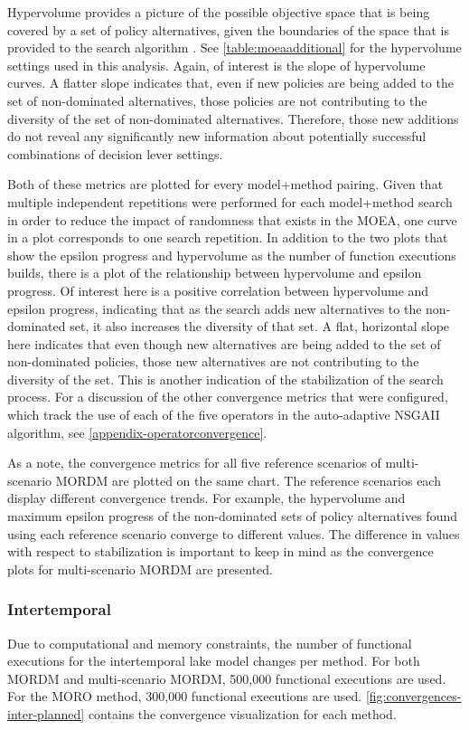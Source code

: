     Hypervolume provides a picture of the possible objective space that is being covered by a set of policy alternatives, given the boundaries of the space that is provided to the search algorithm \citep{Reed2013}.  See \cref{table:moeaadditional} for the hypervolume settings used in this analysis. Again, of interest is the slope of hypervolume curves. A flatter slope indicates that, even if new policies are being added to the set of non-dominated alternatives, those policies are not contributing to the diversity of the set of non-dominated alternatives. Therefore, those new additions do not reveal any significantly new information about potentially successful combinations of decision lever settings.
    
    Both of these metrics are plotted for every model+method pairing. Given that multiple independent repetitions were performed for each model+method search in order to reduce the impact of randomness that exists in the MOEA, one curve in a plot corresponds to one search repetition. In addition to the two plots that show the epsilon progress and hypervolume as the number of function executions builds, there is a plot of the relationship between hypervolume and epsilon progress. Of interest here is a positive correlation between hypervolume and epsilon progress, indicating that as the search adds new alternatives to the non-dominated set, it also increases the diversity of that set. A flat, horizontal slope here indicates that even though new alternatives are being added to the set of non-dominated policies, those new alternatives are not contributing to the diversity of the set. This is another indication of the stabilization of the search process. For a discussion of the other convergence metrics that were configured, which track the use of each of the five operators in the auto-adaptive NSGAII algorithm, see \cref{appendix-operatorconvergence}.
    
    As a note, the convergence metrics for all five reference scenarios of multi-scenario MORDM are plotted on the same chart. The reference scenarios each display different convergence trends. For example, the hypervolume and maximum epsilon progress of the non-dominated sets of policy alternatives found using each reference scenario converge to different values. The difference in values with respect to stabilization is important to keep in mind as the convergence plots for multi-scenario MORDM are presented.
    
        \subsubsection{Intertemporal}
        Due to computational and memory constraints, the number of functional executions for the intertemporal lake model changes per method. For both MORDM and multi-scenario MORDM, 500,000 functional executions are used. For the MORO method, 300,000 functional executions are used. \cref{fig:convergences-inter-planned} contains the convergence visualization for each method.
        
